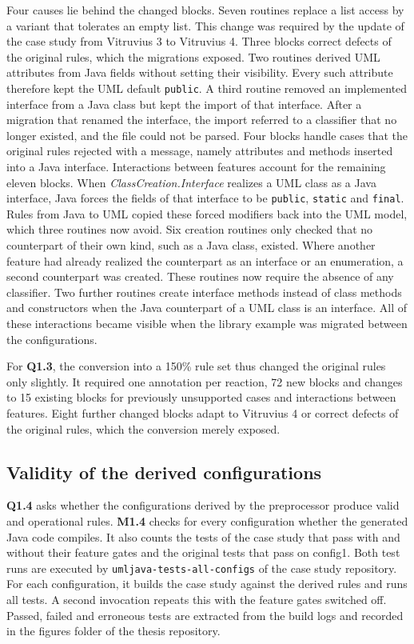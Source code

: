 Four causes lie behind the changed blocks.
Seven routines replace a list access by a variant that tolerates an empty list.
This change was required by the update of the case study from Vitruvius 3 to Vitruvius 4.
Three blocks correct defects of the original rules, which the migrations exposed.
Two routines derived UML attributes from Java fields without setting their visibility.
Every such attribute therefore kept the UML default \texttt{public}.
A third routine removed an implemented interface from a Java class but kept the import of that interface.
After a migration that renamed the interface, the import referred to a classifier that no longer existed, and the file could not be parsed.
Four blocks handle cases that the original rules rejected with a message, namely attributes and methods inserted into a Java interface.
Interactions between features account for the remaining eleven blocks.
When \textit{ClassCreation.Interface} realizes a UML class as a Java interface, Java forces the fields of that interface to be \texttt{public}, \texttt{static} and \texttt{final}.
Rules from Java to UML copied these forced modifiers back into the UML model, which three routines now avoid.
Six creation routines only checked that no counterpart of their own kind, such as a Java class, existed.
Where another feature had already realized the counterpart as an interface or an enumeration, a second counterpart was created.
These routines now require the absence of any classifier.
Two further routines create interface methods instead of class methods and constructors when the Java counterpart of a UML class is an interface.
All of these interactions became visible when the library example was migrated between the configurations.

For \textbf{Q1.3}, the conversion into a 150\% rule set thus changed the original rules only slightly.
It required one annotation per reaction, 72 new blocks and changes to 15 existing blocks for previously unsupported cases and interactions between features.
Eight further changed blocks adapt to Vitruvius 4 or correct defects of the original rules, which the conversion merely exposed.

\subsection{Validity of the derived configurations}
\label{sec:Evaluation:AnnotationMechanism:ValidityOfTheDerivedConfigurations}

\textbf{Q1.4} asks whether the configurations derived by the preprocessor produce valid and operational rules.
\textbf{M1.4} checks for every configuration whether the generated Java code compiles.
It also counts the tests of the case study that pass with and without their feature gates and the original tests that pass on config1.
Both test runs are executed by \texttt{umljava-tests-all-configs} of the case study repository.
For each configuration, it builds the case study against the derived rules and runs all tests.
A second invocation repeats this with the feature gates switched off.
Passed, failed and erroneous tests are extracted from the build logs and recorded in the figures folder of the thesis repository.

